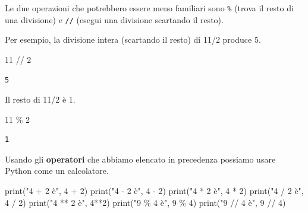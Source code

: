 \documentclass[
  letterpaper,
  krantz2]{{[}./krantz{]}}
\newenvironment{Shaded}{\begin{snugshade}}{\end{snugshade}}
\newcommand{\BuiltInTok}[1]{\textcolor[rgb]{0.00,0.23,0.31}{#1}}
\newcommand{\DecValTok}[1]{\textcolor[rgb]{0.68,0.00,0.00}{#1}}
\newcommand{\NormalTok}[1]{\textcolor[rgb]{0.00,0.23,0.31}{#1}}
\newcommand{\OperatorTok}[1]{\textcolor[rgb]{0.37,0.37,0.37}{#1}}
\newcommand{\StringTok}[1]{\textcolor[rgb]{0.13,0.47,0.30}{#1}}
\begin{document}
Le due operazioni che potrebbero essere meno familiari sono \texttt{\%}
(trova il resto di una divisione) e \texttt{//} (esegui una divisione
scartando il resto).

Per esempio, la divisione intera (scartando il resto) di 11/2 produce 5.

\begin{Shaded}
\begin{Highlighting}[]
\DecValTok{11} \OperatorTok{//} \DecValTok{2}
\end{Highlighting}
\end{Shaded}

\begin{verbatim}
5
\end{verbatim}

Il resto di 11/2 è 1.

\begin{Shaded}
\begin{Highlighting}[]
\DecValTok{11} \OperatorTok{\%} \DecValTok{2}
\end{Highlighting}
\end{Shaded}

\begin{verbatim}
1
\end{verbatim}

Usando gli \textbf{operatori} che abbiamo elencato in precedenza
possiamo usare Python come un calcolatore.

\begin{Shaded}
\begin{Highlighting}[]
\BuiltInTok{print}\NormalTok{(}\StringTok{"4 + 2 è"}\NormalTok{, }\DecValTok{4} \OperatorTok{+} \DecValTok{2}\NormalTok{)}
\BuiltInTok{print}\NormalTok{(}\StringTok{"4 {-} 2 è"}\NormalTok{, }\DecValTok{4} \OperatorTok{{-}} \DecValTok{2}\NormalTok{)}
\BuiltInTok{print}\NormalTok{(}\StringTok{"4 * 2 è"}\NormalTok{, }\DecValTok{4} \OperatorTok{*} \DecValTok{2}\NormalTok{)}
\BuiltInTok{print}\NormalTok{(}\StringTok{"4 / 2 è"}\NormalTok{, }\DecValTok{4} \OperatorTok{/} \DecValTok{2}\NormalTok{)}
\BuiltInTok{print}\NormalTok{(}\StringTok{"4 ** 2 è"}\NormalTok{, }\DecValTok{4}\OperatorTok{**}\DecValTok{2}\NormalTok{)}
\BuiltInTok{print}\NormalTok{(}\StringTok{"9 \% 4 è"}\NormalTok{, }\DecValTok{9} \OperatorTok{\%} \DecValTok{4}\NormalTok{)}
\BuiltInTok{print}\NormalTok{(}\StringTok{"9 // 4 è"}\NormalTok{, }\DecValTok{9} \OperatorTok{//} \DecValTok{4}\NormalTok{)}
\end{Highlighting}
\end{Shaded}
\end{document}
